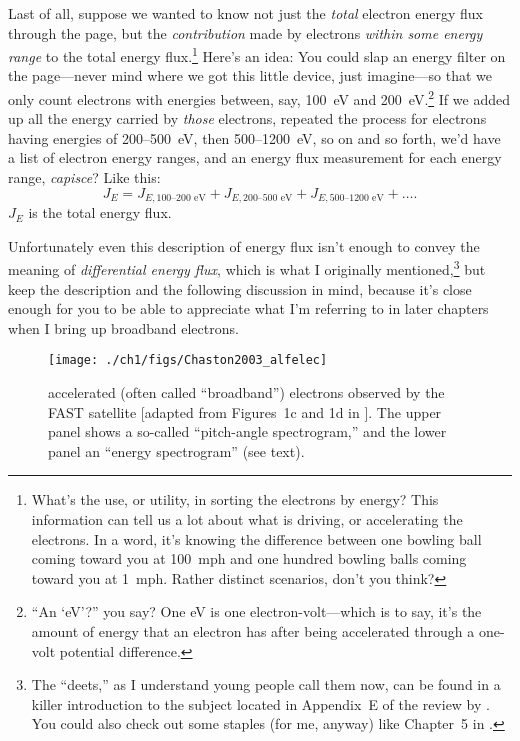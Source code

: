 Last of all, suppose we wanted to know not just the \emph{total} electron energy
flux through the page, but the \emph{contribution} made by electrons
\emph{within some energy range} to the total energy flux.\footnote{What's the
  use, or utility, in sorting the electrons by energy? This information can tell
  us a lot about what is driving, or accelerating the electrons. In a word, it's
  knowing the difference between one bowling ball coming toward you at 100~mph
  and one hundred bowling balls coming toward you at 1~mph. Rather distinct
  scenarios, don't you think?} Here's an idea: You could slap an energy filter
on the page---never mind where we got this little device, just imagine---so that
we only count electrons with energies between, say, 100~eV and
200~eV.\footnote{``An `eV'?''  you say? One eV is one electron-volt---which is
  to say, it's the amount of energy that an electron has after being accelerated
  through a one-volt potential difference.} If we added up all the energy
carried by \emph{those} electrons, repeated the process for electrons having
energies of 200--500~eV, then 500--1200~eV, so on and so forth, we'd have a list
of electron energy ranges, and an energy flux measurement for each energy range,
\emph{capisce}? Like this:
\begin{equation}
  \label{ch1:eqeFlux}
  J_{E} = J_{E,\textrm{100--200 eV}} + J_{E,\textrm{200--500 eV}} + J_{E,\textrm{500--1200 eV}} + \dots .
\end{equation}
$J_E$ is the total energy flux.

Unfortunately even this description of energy flux isn't enough to
convey the meaning of \emph{differential energy flux}, which is what I
originally mentioned,\footnote{The ``deets,'' as I understand young
  people call them now, can be found in a killer introduction to the
  subject located in Appendix~E of the review by
  \citet{Bruno2013}. You could also check out some staples (for me,
  anyway) like Chapter~5 in \citet{Paschmann1998}.} but keep the
description and the following discussion in mind, because it's close
enough for you to be able to appreciate what I'm referring to in later
chapters when I bring up broadband electrons.


\begin{figure}
  \centering
  \noindent\texttt{[image: ./ch1/figs/Chaston2003\_alfelec]}
  \caption[\Alfically accelerated (broadband) electrons]{\Alfically
    accelerated (often called ``broadband'') electrons observed by
    the FAST satellite [adapted from Figures~1c and 1d in
    \citealp{Chaston2003a}]. The upper panel shows a so-called
    ``pitch-angle spectrogram,'' and the lower panel an ``energy
    spectrogram'' (see text).}
  \label{ch1:FigAlfElec}
\end{figure}

